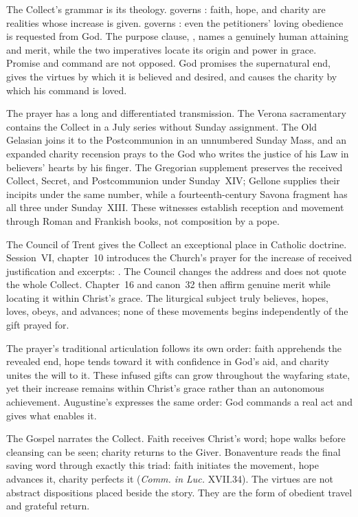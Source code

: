 The Collect's grammar is its theology.  governs :
faith, hope, and charity are realities whose increase is given. 
governs : even the petitioners' loving obedience is requested
from God. The purpose clause, , names
a genuinely human attaining and merit, while the two imperatives locate its
origin and power in grace. Promise and command are not opposed. God promises
the supernatural end, gives the virtues by which it is believed and desired,
and causes the charity by which his command is loved.

The prayer has a long and differentiated transmission. The Verona sacramentary
contains the Collect in a July series without Sunday assignment. The Old
Gelasian joins it to the Postcommunion in an unnumbered Sunday Mass, and an
expanded charity recension prays to the God who writes the justice of his Law
in believers' hearts by his finger. The Gregorian supplement preserves the
received Collect, Secret, and Postcommunion under Sunday~XIV; Gellone supplies
their incipits under the same number, while a fourteenth-century Savona fragment
has all three under Sunday~XIII. These witnesses establish reception and
movement through Roman and Frankish books, not composition by a pope.

The Council of Trent gives the Collect an exceptional place in Catholic
doctrine. Session~VI, chapter~10 introduces the Church's prayer for the
increase of received justification and excerpts: . The Council changes the address and does
not quote the whole Collect. Chapter~16 and canon~32 then affirm genuine merit
while locating it within Christ's grace. The liturgical subject truly believes,
hopes, loves, obeys, and advances; none of these movements begins independently
of the gift prayed for.

The prayer's traditional articulation follows its own order: faith apprehends
the revealed end, hope tends toward it with confidence in God's aid, and
charity unites the will to it. These infused gifts can grow throughout the
wayfaring state, yet their increase remains within Christ's grace rather than
an autonomous achievement. Augustine's 
expresses the same order: God commands a real act and gives what enables it.

The Gospel narrates the Collect. Faith receives Christ's word; hope walks
before cleansing can be seen; charity returns to the Giver. Bonaventure reads
the final saving word through exactly this triad: faith initiates the movement,
hope advances it, charity perfects it (\emph{Comm. in Luc.} XVII.34). The
virtues are not abstract dispositions placed beside the story. They are the
form of obedient travel and grateful return.

